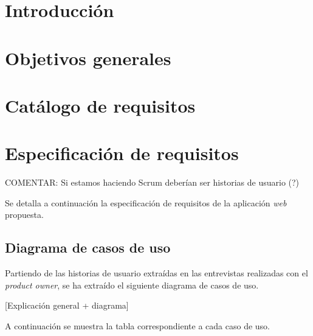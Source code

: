 
\section{Introducción}

\section{Objetivos generales}

\section{Catálogo de requisitos}

\section{Especificación de requisitos}

COMENTAR: Si estamos haciendo Scrum deberían ser historias de usuario (?)

Se detalla a continuación la especificación de requisitos de la aplicación \textit{web} propuesta.

\subsection{Diagrama de casos de uso}

Partiendo de las historias de usuario extraídas en las entrevistas realizadas con el \textit{product owner}, se ha extraído el siguiente diagrama de casos de uso.

[Explicación general + diagrama]

A continuación se muestra la tabla correspondiente a cada caso de uso.

